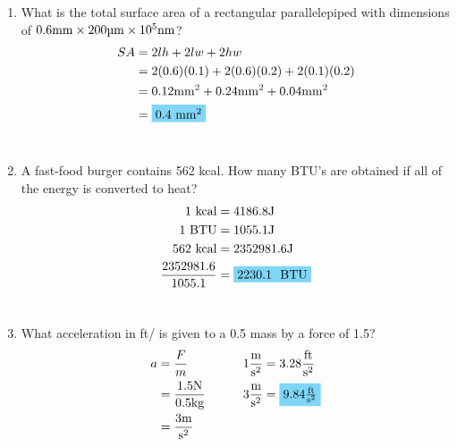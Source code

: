 \begin{enumerate}[leftmargin=2cm,labelsep=.5cm,label=\bfseries\alph*)]
	\item What is the total surface area of a rectangular parallelepiped with dimensions of $ 0.6 \qw{\mm} \times 200 \qw{\um} \times 10^5 \qw{\nm}$?\\
	\begin{align*}
	SA & = 2lh + 2lw + 2hw \\
	   & = 2(0.6)(0.1) + 2(0.6)(0.2) + 2(0.1)(0.2) \\
	   & = 0.12 \qw{\mm\squared} + 0.24 \qw{\mm\squared} + 0.04 \qw{\mm\squared} \\
	   & = \hlbox{0.4 \qw{\mm\squared}} \\
	\end{align*}
	\\[1cm]
	
	\item A fast-food burger contains 562 kcal. How many BTU's are obtained if all of the energy is converted to heat?\\
	\begin{align*}
	1 \text{ kcal} 				&= 4186.8 \qw{\joule} \\
	1 \text{ BTU} 				&= 1055.1 \qw{\joule} \\
	562 \text{ kcal} 			&= 2352981.6 \qw{\joule} \\
	\frac{2352981.6}{1055.1} 	&= \hlbox{2230.1 \text{ BTU}} \\
	\end{align*}
	\\[1cm]
	
	\item What acceleration in ft/\qw{\square\second} is given to a 0.5\qw{\kg} mass by a force of 1.5\qw{\newton}?\\
	\begin{align*}
	a&=\frac{F}{m} & \qquad 1\frac{\qw{\meter}}{\qw{\square\second}}&=3.28\frac{\text{ft}}{\qw{\square\second}} \\
	 &=\frac{1.5\qw{\newton}}{0.5\qw{\kg}} & 3\frac{\qw{\meter}}{\qw{\square\second}} &= \hlbox{$9.84\frac{\text{ft}}{\qw{\square\second}}$} \\
	 &=\frac{3\qw{\meter}}{\qw{\square\second}} &
	\end{align*}
\end{enumerate}